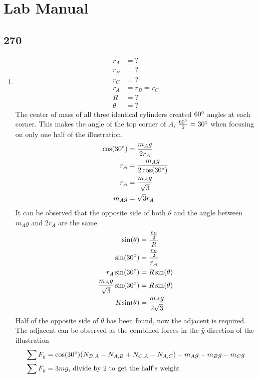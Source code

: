 \documentclass{article}
\begin{document}
\section{Lab Manual}

\subsection{270}
\begin{enumerate}[label=\textbf{(\alph*)}]
	\item
		\begin{align*}
			r_A & = ? \\
			r_B & = ? \\
			r_C & = ? \\
			r_A & = r_B = r_C \\
			R & = ? \\
			\theta & = ?
		\end{align*}
		The center of mass of all three identical cylinders created $ 60\degree $ angles at each corner. This makes the angle of the top corner of $ A $, $ \frac{60\degree}{2} = 30\degree $ when focusing on only one half of the illustration.
		\begin{align*}
			\cos(30\degree) & = \frac{m_Ag}{2r_A} \\
			r_A & = \frac{m_Ag}{2 \cos(30\degree)} \\
			r_A & = \frac{m_Ag}{\sqrt{3}} \\
			m_Ag & = \sqrt{3}r_A
		\end{align*}
		It can be observed that the opposite side of both $ \theta $ and the angle between $ m_Ag $ and $ 2r_A $ are the same
		\begin{align*}
			\sin(\theta) & = \frac{ \frac{r_B}{2} }{R} \\
			\sin(30\degree) & = \frac{ \frac{r_B}{2} }{r_A} \\
			r_A \sin(30\degree) & = R \sin(\theta) \\
			\frac{m_Ag}{\sqrt{3}} \sin(30\degree) & = R \sin(\theta) \\
			R \sin(\theta) & = \frac{m_Ag}{2\sqrt{3}}
		\end{align*}
		Half of the opposite side of $ \theta $ has been found, now the adjacent is required. The adjacent can be observed as the combined forces in the $ \hat{y} $ direction of the illustration
		\begin{align*}
			\sum F_y & = \cos(30\degree)(N_{B,A} - N_{A,B} + N_{C,A} - N_{A,C}) - m_Ag - m_Bg - m_Cg \\
			\sum F_y & = 3mg \text{, divide by 2 to get the half's weight} \\

\end{align*}
\end{enumerate}
\end{document}
